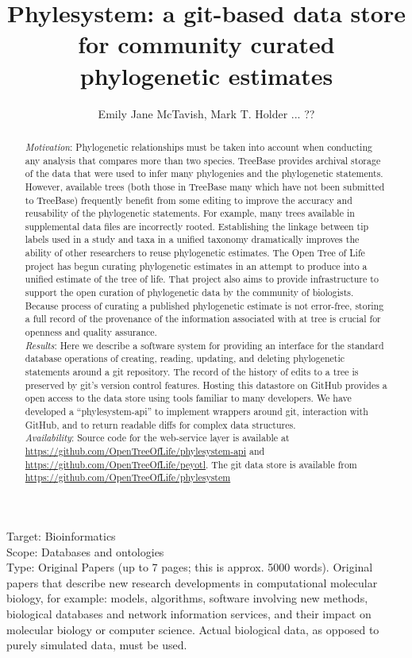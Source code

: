 \documentclass[a4paper,10pt]{article}
\title{Phylesystem: a git-based data store for community curated phylogenetic estimates}
\author{Emily Jane McTavish, Mark T. Holder ... ??}
\begin{document}
\maketitle
Target: Bioinformatics\\
Scope: Databases and ontologies\\
Type: Original Papers (up to 7 pages; this is approx. 5000 words).
Original papers that describe new research developments in computational molecular biology, for example: 
models, algorithms, software involving new methods, biological databases and network information services, and their impact on molecular biology or computer science. 
Actual biological data, as opposed to purely simulated data, must be used.


\begin{abstract}
    {\em Motivation}:
Phylogenetic relationships must be taken into account when conducting any analysis that compares more than two species.
TreeBase provides archival storage of the data that were used to infer many phylogenies and the phylogenetic statements.
However, available trees (both those in TreeBase many which have not been submitted to TreeBase) frequently benefit from some editing
 to improve the accuracy and reusability of the phylogenetic statements.
For example, many trees available in supplemental data files are incorrectly rooted.
Establishing the linkage between tip labels used in a study and taxa in a unified taxonomy dramatically improves the
    ability of other researchers to reuse phylogenetic estimates.
The Open Tree of Life project has begun curating phylogenetic estimates in an attempt to produce into a unified estimate of the tree of life.
That project also aims to provide infrastructure to support the open curation of phylogenetic data by the community of biologists.
Because process of curating a published phylogenetic estimate is not error-free, storing a full record of the provenance of the information
associated with at tree is crucial for openness and quality assurance.\\
{\em Results}:
Here we describe a software system for providing an interface for the standard database operations of creating, reading, updating, and deleting
phylogenetic statements around a git repository.
The record of the history of edits to a tree is preserved by git's version control features.
Hosting this datastore on GitHub provides a open access to the data store using tools familiar to many developers.
We have developed a ``phylesystem-api'' to implement wrappers around git, interaction with GitHub, and to return readable diffs for complex data structures. \\
{\em Availability}:
Source code for the web-service layer is available at \url{https://github.com/OpenTreeOfLife/phylesystem-api}
and \url{https://github.com/OpenTreeOfLife/peyotl}.
The git data store is available from \url{https://github.com/OpenTreeOfLife/phylesystem}
\end{abstract}
\end{document}
